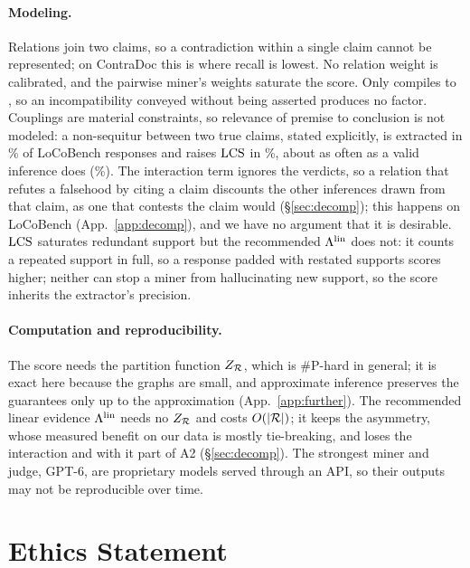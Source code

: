 \paragraph{Modeling.} Relations join two claims, so a contradiction within a single claim cannot
be represented; on ContraDoc this is where recall is lowest. No relation weight is calibrated, and
the pairwise miner's weights saturate the score. Only  compiles to \con{}, so an
incompatibility conveyed without being asserted produces no factor. Couplings are material
constraints, so relevance of premise to conclusion is not modeled: a non-sequitur between two true
claims, stated explicitly, is extracted in \nsExtracted\% of LoCoBench responses and raises $\mathrm{LCS}$ in
\nsLcsRise\%, about as often as a valid inference does (\nvLcsRise\%). The interaction term ignores the
verdicts, so a relation that refutes a falsehood by citing a claim discounts the other inferences
drawn from that claim, as one that contests the claim would (\S\ref{sec:decomp}); this happens on
LoCoBench (App.~\ref{app:decomp}), and we have no argument that it is desirable. $\mathrm{LCS}$ saturates redundant support but the recommended $\Lambda^{\mathrm{lin}}$ does not: it counts a repeated
support in full, so a response padded with restated supports scores higher; neither can stop a miner
from hallucinating new support, so the score inherits the extractor's precision.

\paragraph{Computation and reproducibility.} The score needs the partition function $Z_{\mathcal{R}}$, which
is \#P-hard in general; it is exact here because the graphs are small, and approximate inference
preserves the guarantees only up to the approximation (App.~\ref{app:further}). The recommended linear evidence $\Lambda^{\mathrm{lin}}$ needs no $Z_{\mathcal{R}}$ and costs $O(|\mathcal{R}|)$; it keeps the asymmetry,
whose measured benefit on our data is mostly tie-breaking, and loses the interaction and with it part
of A2
(\S\ref{sec:decomp}). The strongest miner
and judge, GPT-6, are proprietary models served through an API, so their outputs may not be
reproducible over time.

\section*{Ethics Statement}

